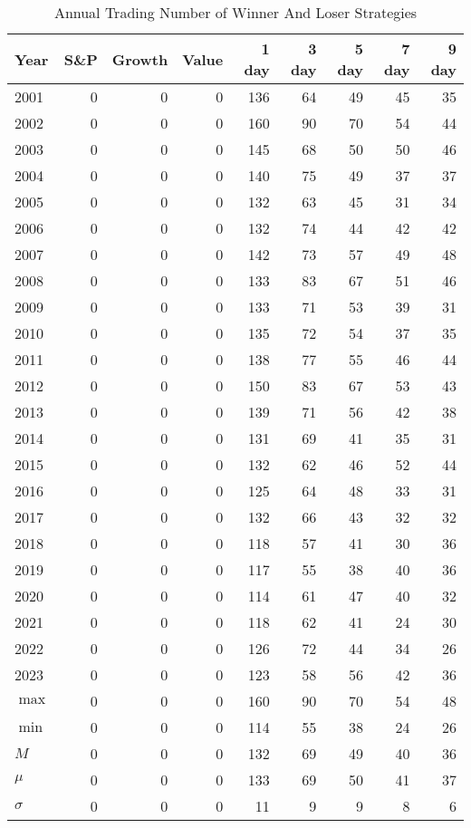 \documentclass{article}
\begin{document}
\begin{table}[!ht]
    \centering
    \caption{Annual Trading Number of Winner And Loser Strategies}
\begin{tabular}{lrrrrrrrr}
\hline
Year & S\&P & Growth & Value & 1 day & 3 day & 5 day & 7 day & 9 day \\
\hline
        2001 & 0 & 0 & 0 & 136 & 64 & 49 & 45 & 35 \\ 
        2002 & 0 & 0 & 0 & 160 & 90 & 70 & 54 & 44 \\ 
        2003 & 0 & 0 & 0 & 145 & 68 & 50 & 50 & 46 \\ 
        2004 & 0 & 0 & 0 & 140 & 75 & 49 & 37 & 37 \\ 
        2005 & 0 & 0 & 0 & 132 & 63 & 45 & 31 & 34 \\ 
        2006 & 0 & 0 & 0 & 132 & 74 & 44 & 42 & 42 \\ 
        2007 & 0 & 0 & 0 & 142 & 73 & 57 & 49 & 48 \\ 
        2008 & 0 & 0 & 0 & 133 & 83 & 67 & 51 & 46 \\ 
        2009 & 0 & 0 & 0 & 133 & 71 & 53 & 39 & 31 \\ 
        2010 & 0 & 0 & 0 & 135 & 72 & 54 & 37 & 35 \\ 
        2011 & 0 & 0 & 0 & 138 & 77 & 55 & 46 & 44 \\ 
        2012 & 0 & 0 & 0 & 150 & 83 & 67 & 53 & 43 \\ 
        2013 & 0 & 0 & 0 & 139 & 71 & 56 & 42 & 38 \\ 
        2014 & 0 & 0 & 0 & 131 & 69 & 41 & 35 & 31 \\ 
        2015 & 0 & 0 & 0 & 132 & 62 & 46 & 52 & 44 \\ 
        2016 & 0 & 0 & 0 & 125 & 64 & 48 & 33 & 31 \\ 
        2017 & 0 & 0 & 0 & 132 & 66 & 43 & 32 & 32 \\ 
        2018 & 0 & 0 & 0 & 118 & 57 & 41 & 30 & 36 \\ 
        2019 & 0 & 0 & 0 & 117 & 55 & 38 & 40 & 36 \\ 
        2020 & 0 & 0 & 0 & 114 & 61 & 47 & 40 & 32 \\ 
        2021 & 0 & 0 & 0 & 118 & 62 & 41 & 24 & 30 \\ 
        2022 & 0 & 0 & 0 & 126 & 72 & 44 & 34 & 26 \\ 
        2023 & 0 & 0 & 0 & 123 & 58 & 56 & 42 & 36 \\ 
        $\max$ & 0 & 0 & 0 & 160 & 90 & 70 & 54 & 48 \\ 
        $\min$ & 0 & 0 & 0 & 114 & 55 & 38 & 24 & 26 \\ 
        $M$ & 0 & 0 & 0 & 132 & 69 & 49 & 40 & 36 \\ 
        $\mu$  & 0 & 0 & 0 & 133 & 69 & 50 & 41 & 37 \\ 
        $\sigma$ & 0 & 0 & 0 & 11 & 9 & 9 & 8 & 6 \\ 

\hline
\end{tabular}
\end{table}
\end{document}
